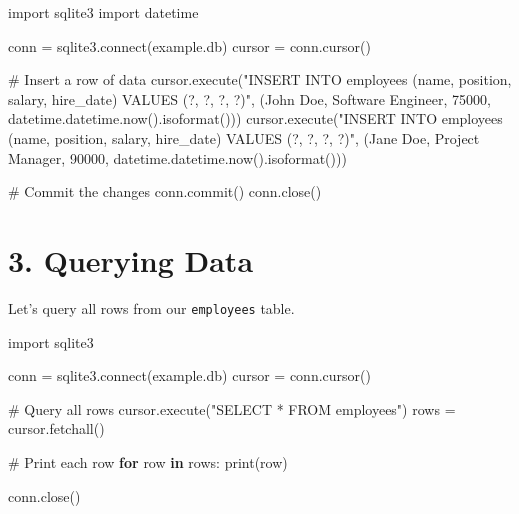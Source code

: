 \documentclass[
  letterpaper,
  DIV=11,
  numbers=noendperiod]{scrreprt}
\newenvironment{Shaded}{\begin{snugshade}}{\end{snugshade}}
\newcommand{\BuiltInTok}[1]{\textcolor[rgb]{0.00,0.23,0.31}{#1}}
\newcommand{\CommentTok}[1]{\textcolor[rgb]{0.37,0.37,0.37}{#1}}
\newcommand{\ControlFlowTok}[1]{\textcolor[rgb]{0.00,0.23,0.31}{\textbf{#1}}}
\newcommand{\DecValTok}[1]{\textcolor[rgb]{0.68,0.00,0.00}{#1}}
\newcommand{\ExtensionTok}[1]{\textcolor[rgb]{0.00,0.23,0.31}{#1}}
\newcommand{\ImportTok}[1]{\textcolor[rgb]{0.00,0.46,0.62}{#1}}
\newcommand{\KeywordTok}[1]{\textcolor[rgb]{0.00,0.23,0.31}{\textbf{#1}}}
\newcommand{\NormalTok}[1]{\textcolor[rgb]{0.00,0.23,0.31}{#1}}
\newcommand{\OperatorTok}[1]{\textcolor[rgb]{0.37,0.37,0.37}{#1}}
\newcommand{\StringTok}[1]{\textcolor[rgb]{0.13,0.47,0.30}{#1}}
\begin{document}
\begin{Shaded}
\begin{Highlighting}[]
\ImportTok{import}\NormalTok{ sqlite3}
\ImportTok{import}\NormalTok{ datetime}

\NormalTok{conn }\OperatorTok{=}\NormalTok{ sqlite3.}\ExtensionTok{connect}\NormalTok{(}\StringTok{\textquotesingle{}example.db\textquotesingle{}}\NormalTok{)}
\NormalTok{cursor }\OperatorTok{=}\NormalTok{ conn.cursor()}

\CommentTok{\# Insert a row of data}
\NormalTok{cursor.execute(}\StringTok{"INSERT INTO employees (name, position, salary, hire\_date) VALUES (?, ?, ?, ?)"}\NormalTok{,}
\NormalTok{               (}\StringTok{\textquotesingle{}John Doe\textquotesingle{}}\NormalTok{, }\StringTok{\textquotesingle{}Software Engineer\textquotesingle{}}\NormalTok{, }\DecValTok{75000}\NormalTok{, datetime.datetime.now().isoformat()))}
\NormalTok{cursor.execute(}\StringTok{"INSERT INTO employees (name, position, salary, hire\_date) VALUES (?, ?, ?, ?)"}\NormalTok{,}
\NormalTok{               (}\StringTok{\textquotesingle{}Jane Doe\textquotesingle{}}\NormalTok{, }\StringTok{\textquotesingle{}Project Manager\textquotesingle{}}\NormalTok{, }\DecValTok{90000}\NormalTok{, datetime.datetime.now().isoformat()))}

\CommentTok{\# Commit the changes}
\NormalTok{conn.commit()}
\NormalTok{conn.close()}
\end{Highlighting}
\end{Shaded}

\section{3. Querying Data}\label{querying-data}

Let's query all rows from our \texttt{employees} table.

\begin{Shaded}
\begin{Highlighting}[]
\ImportTok{import}\NormalTok{ sqlite3}

\NormalTok{conn }\OperatorTok{=}\NormalTok{ sqlite3.}\ExtensionTok{connect}\NormalTok{(}\StringTok{\textquotesingle{}example.db\textquotesingle{}}\NormalTok{)}
\NormalTok{cursor }\OperatorTok{=}\NormalTok{ conn.cursor()}

\CommentTok{\# Query all rows}
\NormalTok{cursor.execute(}\StringTok{"SELECT * FROM employees"}\NormalTok{)}
\NormalTok{rows }\OperatorTok{=}\NormalTok{ cursor.fetchall()}

\CommentTok{\# Print each row}
\ControlFlowTok{for}\NormalTok{ row }\KeywordTok{in}\NormalTok{ rows:}
    \BuiltInTok{print}\NormalTok{(row)}

\NormalTok{conn.close()}
\end{Highlighting}
\end{Shaded}
\end{document}
